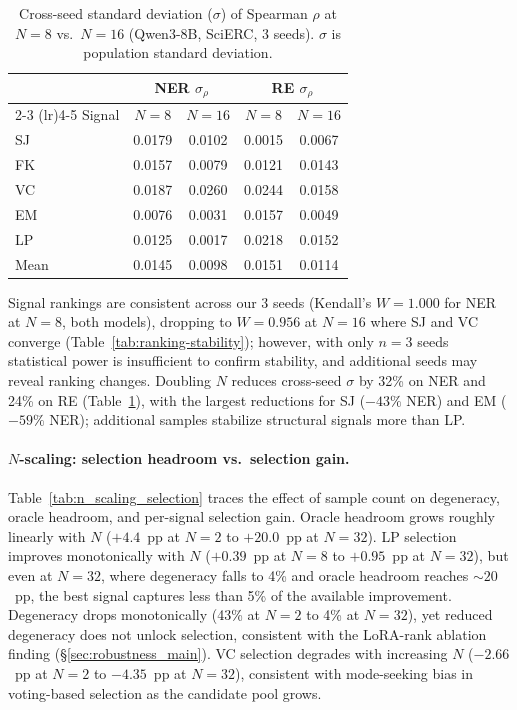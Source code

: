 \begin{table}[t]
\centering
\caption{Cross-seed standard deviation ($\sigma$) of Spearman $\rho$ at $N\!=\!8$ vs.\ $N\!=\!16$ (Qwen3-8B, SciERC, 3 seeds). $\sigma$ is population standard deviation.}
\label{tab:sigma-comparison}
\small
\begin{tabular}{l cc cc}
\toprule
 & \multicolumn{2}{c}{\textbf{NER} $\sigma_\rho$} & \multicolumn{2}{c}{\textbf{RE} $\sigma_\rho$} \\
\cmidrule(lr){2-3} \cmidrule(lr){4-5}
Signal & $N\!=\!8$ & $N\!=\!16$ & $N\!=\!8$ & $N\!=\!16$ \\
\midrule
SJ & 0.0179 & 0.0102 & 0.0015 & 0.0067 \\
FK & 0.0157 & 0.0079 & 0.0121 & 0.0143 \\
VC & 0.0187 & 0.0260 & 0.0244 & 0.0158 \\
EM & 0.0076 & 0.0031 & 0.0157 & 0.0049 \\
LP & 0.0125 & 0.0017 & 0.0218 & 0.0152 \\
\midrule
Mean & 0.0145 & 0.0098 & 0.0151 & 0.0114 \\
\bottomrule
\end{tabular}
\end{table}

Signal rankings are consistent across our 3 seeds (Kendall's $W{=}1.000$ for NER at $N{=}8$, both models), dropping to $W{=}0.956$ at $N{=}16$ where SJ and VC converge (Table~\ref{tab:ranking-stability}); however, with only $n{=}3$ seeds statistical power is insufficient to confirm stability, and additional seeds may reveal ranking changes.
Doubling $N$ reduces cross-seed $\sigma$ by 32\% on NER and 24\% on RE (Table~\ref{tab:sigma-comparison}), with the largest reductions for SJ ($-43\%$ NER) and EM ($-59\%$ NER); additional samples stabilize structural signals more than LP.

\paragraph{$N$-scaling: selection headroom vs.\ selection gain.}
Table~\ref{tab:n_scaling_selection} traces the effect of sample count on degeneracy, oracle headroom, and per-signal selection gain.
Oracle headroom grows roughly linearly with $N$ ($+4.4$~pp at $N{=}2$ to $+20.0$~pp at $N{=}32$).
LP selection improves monotonically with $N$ ($+0.39$~pp at $N{=}8$ to $+0.95$~pp at $N{=}32$), but even at $N{=}32$, where degeneracy falls to 4\% and oracle headroom reaches ${\sim}20$~pp, the best signal captures less than 5\% of the available improvement.
Degeneracy drops monotonically (43\% at $N{=}2$ to 4\% at $N{=}32$), yet reduced degeneracy does not unlock selection, consistent with the LoRA-rank ablation finding (\S\ref{sec:robustness_main}).
VC selection degrades with increasing $N$ ($-2.66$~pp at $N{=}2$ to $-4.35$~pp at $N{=}32$), consistent with mode-seeking bias in voting-based selection as the candidate pool grows.

